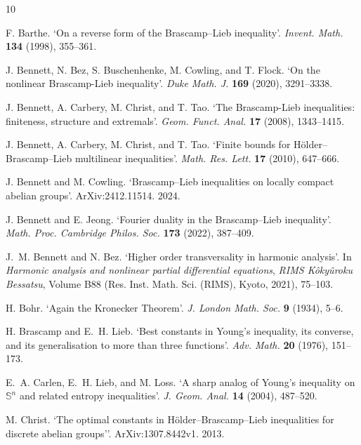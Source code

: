 \documentclass[12pt,twoside,a4paper]{amsart}
\theoremstyle{definition}
\theoremstyle{remark}
\numberwithin{equation}{section}
\begin{document}
\begin{thebibliography}{10}
\newcommand{\enquote}[1]{`#1'}

F. Barthe.
\enquote{On a reverse form of the {B}rascamp--{L}ieb inequality}.
\emph{Invent. Math.} \textbf{ 134} (1998), 355--361.

J. Bennett, N. Bez, S. Buschenhenke, M. Cowling, and T. Flock.
\enquote{On the nonlinear {B}rascamp-{L}ieb inequality}.
\emph{Duke Math. J.} \textbf{ 169} (2020), 3291--3338.

J. Bennett, A. Carbery, M. Christ, and T. Tao.
\enquote{The {B}rascamp-{L}ieb inequalities: finiteness, structure
  and extremals}.
\emph{Geom. Funct. Anal.} \textbf{ 17} (2008), 1343--1415.

J. Bennett, A. Carbery, M. Christ, and T. Tao.
\enquote{Finite bounds for {H}ölder--{B}rascamp--{L}ieb multilinear
  inequalities}.
\emph{Math. Res. Lett.} \textbf{ 17} (2010), 647--666.

J. Bennett and M. Cowling.
\enquote{{B}rascamp--{L}ieb inequalities on locally compact abelian
  groups}.
ArXiv:2412.11514.
2024.

J. Bennett and E. Jeong.
\enquote{Fourier duality in the {B}rascamp--{L}ieb inequality}.
\emph{Math. Proc. Cambridge Philos. Soc.} \textbf{ 173} (2022),
  387--409.

J.~M. Bennett and N. Bez.
\enquote{Higher order transversality in harmonic analysis}.
In \emph{Harmonic analysis and nonlinear partial differential
  equations}, \emph{RIMS K\^oky\^uroku Bessatsu}, Volume B88 (Res. Inst. Math.
  Sci. (RIMS), Kyoto, 2021), 75--103.

H. Bohr.
\enquote{Again the {K}ronecker {T}heorem}.
\emph{J. London Math. Soc.} \textbf{ 9} (1934), 5--6.

H. Brascamp and E.~H. Lieb.
\enquote{Best constants in {Y}oung's inequality, its converse, and
  its generalisation to more than three functions}.
\emph{Adv. Math.} \textbf{ 20} (1976), 151--173.

E.~A. Carlen, E.~H. Lieb, and M. Loss.
\enquote{A sharp analog of {Y}oung's inequality on $\mathbb{S}^n$ and
  related entropy inequalities}.
\emph{J. Geom. Anal.} \textbf{ 14} (2004), 487--520.

M. Christ.
\enquote{The optimal constants in {H}ölder--{B}rascamp--{L}ieb
  inequalities for discrete abelian groups'}.
ArXiv:1307.8442v1.
2013.


\end{thebibliography}
\end{document}

